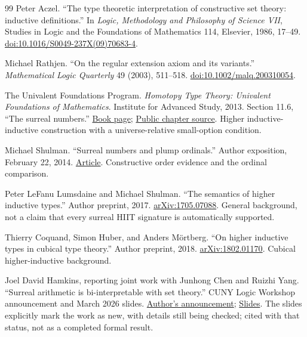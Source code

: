 \documentclass[11pt,letterpaper]{article}
\numberwithin{equation}{section}
\theoremstyle{definition}
\theoremstyle{remark}
\begin{document}
\begin{thebibliography}{99}
Peter Aczel. ``The type theoretic interpretation of constructive set theory: inductive definitions.'' In \emph{Logic, Methodology and Philosophy of Science VII}, Studies in Logic and the Foundations of Mathematics 114, Elsevier, 1986, 17--49.
\href{https://doi.org/10.1016/S0049-237X(09)70683-4}{doi:10.1016/S0049-237X(09)70683-4}.

Michael Rathjen. ``On the regular extension axiom and its variants.'' \emph{Mathematical Logic Quarterly} 49 (2003), 511--518.
\href{https://doi.org/10.1002/malq.200310054}{doi:10.1002/malq.200310054}.

The Univalent Foundations Program. \emph{Homotopy Type Theory: Univalent Foundations of Mathematics}. Institute for Advanced Study, 2013. Section 11.6, ``The surreal numbers.''
\href{https://homotopytypetheory.org/book/}{Book page};
\href{https://github.com/HoTT/book/blob/master/reals.tex}{Public chapter source}. Higher inductive-inductive construction with a universe-relative small-option condition.

Michael Shulman. ``Surreal numbers and plump ordinals.'' Author exposition, February 22, 2014.
\href{https://homotopytypetheory.org/2014/02/22/surreals-plump-ordinals/}{Article}. Constructive order evidence and the ordinal comparison.

Peter LeFanu Lumsdaine and Michael Shulman. ``The semantics of higher inductive types.'' Author preprint, 2017.
\href{https://arxiv.org/abs/1705.07088}{arXiv:1705.07088}. General background, not a claim that every surreal HIIT signature is automatically supported.

Thierry Coquand, Simon Huber, and Anders M\"ortberg. ``On higher inductive types in cubical type theory.'' Author preprint, 2018.
\href{https://arxiv.org/abs/1802.01170}{arXiv:1802.01170}. Cubical higher-inductive background.

Joel David Hamkins, reporting joint work with Junhong Chen and Ruizhi Yang. ``Surreal arithmetic is bi-interpretable with set theory.'' CUNY Logic Workshop announcement and March 2026 slides.
\href{https://jdh.hamkins.org/surreal-arithmetic-cuny-logic-workshop-march-2026/}{Author's announcement};
\href{https://jdh.hamkins.org/wp-content/uploads/Slides-Elementary-theory-of-surreal-arithmetic-Hamkins-CUNY-March-2026.pdf}{Slides}. The slides explicitly mark the work as new, with details still being checked; cited with that status, not as a completed formal result.


\end{thebibliography}
\end{document}
